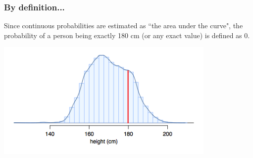 
\begin{frame}
\frametitle{By definition...}

Since continuous probabilities are estimated as ``the area under the curve", the probability of a person being exactly 180 cm (or any exact value) is defined as 0.

\begin{center}
\includegraphics[width=0.8\textwidth]{2-5_continuous_distributions/figures/fdicHeightContDist180}
\end{center}

\end{frame}

